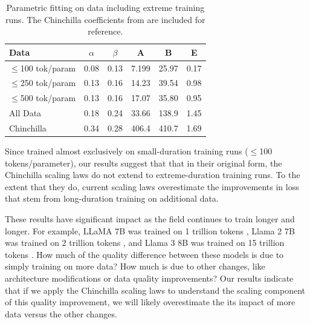 \documentclass{article}
\theoremstyle{plain}
\theoremstyle{definition}
\theoremstyle{remark}
\renewcommand{\textapprox}{\raisebox{0.5ex}{\texttildelow}}
\begin{document}
\begin{table}
  \caption{Parametric fitting on data including extreme training runs. The Chinchilla coefficients from \citet{chinchilla} are included for reference.}
  \label{table:parametricfits}
  \centering
  \begin{tabular}{lccccc}
    \toprule
    Data & $\alpha$ & $\beta$ & A & B & E \\
    \midrule
    $\leq$100 tok/param & 0.08 & 0.13 & 7.199 & 25.97 & 0.17 \\
    $\leq$250 tok/param & 0.13 & 0.16 & 14.23 & 39.54 & 0.98 \\
    $\leq$500 tok/param & 0.13 & 0.16 & 17.07 & 35.80 & 0.95 \\
    All Data & 0.18 & 0.24 & 33.66 & 138.9 & 1.45\\
    \midrule
    Chinchilla & 0.34 & 0.28 & 406.4 &  410.7 & 1.69 \\
    \bottomrule
  \end{tabular}
\end{table}

Since \citet{chinchilla} trained almost exclusively on small-duration training runs ($\leq$\textapprox100 tokens/parameter), our results suggest that that in their original form, the Chinchilla scaling laws do not extend to extreme-duration training runs. To the extent that they do, current scaling laws overestimate the improvements in loss that stem from long-duration training on additional data.

These results have significant impact as the field continues to train longer and longer. For example, LLaMA 7B was trained on 1 trillion tokens \cite{llama}, Llama 2 7B was trained on 2 trillion tokens \cite{llama2}, and Llama 3 8B was trained on 15 trillion tokens \cite{llama3}. How much of the quality difference between these models is due to simply training on more data? How much is due to other changes, like architecture modifications or data quality improvements? Our results indicate that if we apply the Chinchilla scaling laws to understand the scaling component of this quality improvement, we will likely overestimate the its impact of more data versus the other changes.
\end{document}
